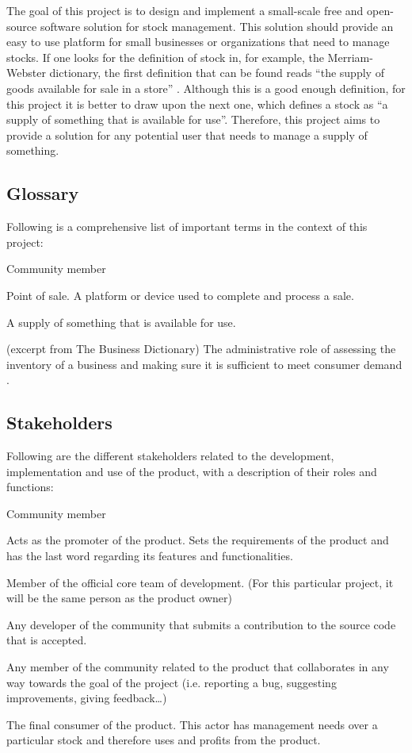 The goal of this project is to design and implement a small-scale free and open-source software solution for stock management. This solution should provide an easy to use platform for small businesses or organizations that need to manage stocks.
If one looks for the definition of stock in, for example, the Merriam-Webster dictionary, the first definition that can be found reads “the supply of goods available for sale in a store” \cite{1}. Although this is a good enough definition, for this project it is better to draw upon the next one, which defines a stock as “a supply of something that is available for use”. Therefore, this project aims to provide a solution for any potential user that needs to manage a supply of something. 

\subsection{Glossary}
Following is a comprehensive list of important terms in the context of this project:

\begin{labeling}{Community member}
\item[POS]{Point of sale. A platform or device used to complete and process a sale.}
\item[Stock]{A supply of something that is available for use.}
\item[Stock management]{(excerpt from The Business Dictionary) The administrative role of assessing the inventory of a business and making sure it is sufficient to meet consumer demand \cite{3}.}
\end{labeling}

\subsection{Stakeholders}
Following are the different stakeholders related to the development, implementation and use of the product, with a description of their roles and functions:

\begin{labeling}{Community member}
\item[Product owner]{Acts as the promoter of the product. Sets the requirements of the product and has the last word regarding its features and functionalities.}
\item[Developer]{Member of the official core team of development. (For this particular project, it will be the same person as the product owner)}
\item[Contributor]{Any developer of the community that submits a contribution to the source code that is accepted.}
\item[Community member]{Any member of the community related to the product that collaborates in any way towards the goal of the project (i.e. reporting a bug, suggesting improvements, giving feedback…)}
\item[User]{The final consumer of the product. This actor has management needs over a particular stock and therefore uses and profits from the product.}
\end{labeling}